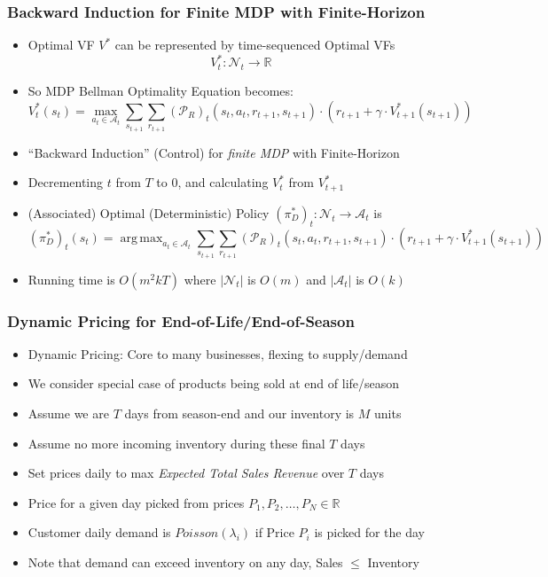 \documentclass[handout]{beamer}
\DeclareMathOperator*{\argmax}{arg\,max}
\begin{document}
\begin{frame}
\frametitle{Backward Induction for Finite MDP with Finite-Horizon}
\pause
\begin{itemize}[<+->]
\item Optimal VF $V^*$ can be represented by time-sequenced Optimal VFs
$$V^*_t: \mathcal{N}_t \rightarrow \mathbb{R}$$
\item So MDP Bellman Optimality Equation becomes: 
$$V^*_t(s_t) = \max_{a_t \in \mathcal{A}_t} \sum_{s_{t+1}} \sum_{r_{t+1}} (\mathcal{P}_R)_t(s_t, a_t, r_{t+1}, s_{t+1}) \cdot (r_{t+1} + \gamma \cdot V^*_{t+1}(s_{t+1}))$$
\item ``Backward Induction'' (Control) for {\em finite MDP} with Finite-Horizon
\item Decrementing $t$ from $T$ to 0, and calculating $V_t^*$ from $V_{t+1}^*$
\item (Associated) Optimal (Deterministic) Policy $(\pi^*_D)_t: \mathcal{N}_t \rightarrow \mathcal{A}_t$ is
$$(\pi^*_D)_t(s_t) = \argmax_{a_t \in \mathcal{A}_t} \sum_{s_{t+1}} \sum_{r_{t+1}} (\mathcal{P}_R)_t(s_t, a_t, r_{t+1}, s_{t+1}) \cdot (r_{t+1} + \gamma \cdot V^*_{t+1}(s_{t+1}))$$
\item Running time is $O(m^2 k T)$ where $|\mathcal{N}_t|$ is $O(m)$ and $|\mathcal{A}_t|$ is $O(k)$
\end{itemize}
\end{frame}

\begin{frame}
\frametitle{Dynamic Pricing for End-of-Life/End-of-Season}
\pause
\begin{itemize}[<+->]
\item Dynamic Pricing: Core to many businesses, flexing to supply/demand
\item We consider special case of products being sold at end of life/season
\item Assume we are $T$ days from season-end and our inventory is $M$ units
\item Assume no more incoming inventory during these final $T$ days
\item Set prices daily to max {\em Expected Total Sales Revenue} over $T$ days
\item Price for a given day picked from prices $P_1, P_2, \ldots, P_N \in \mathbb{R}$
\item Customer daily demand is $Poisson(\lambda_i)$ if Price $P_i$ is picked for the day
\item Note that demand can exceed inventory on any day, Sales $\leq$ Inventory
\end{itemize}
\end{frame}
\end{document}
